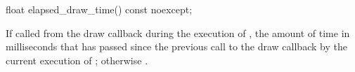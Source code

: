 \begin{itemdecl}
float elapsed_draw_time() const noexcept;
\end{itemdecl}
\begin{itemdescr}
\pnum
\returns
If called from the draw callback during the execution of , the amount of time in milliseconds that has passed since the previous call to the draw callback by the current execution of ; otherwise .
\end{itemdescr}
